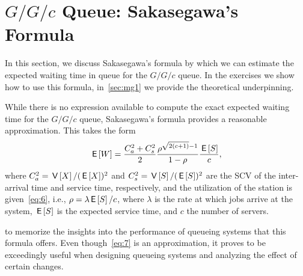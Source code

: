 


\section{$G/G/c$ Queue: Sakasegawa's Formula}\label{sec:gg1}



In this section, we discuss Sakasegawa's formula by which we can estimate the expected waiting time in queue for the $G/G/c$ queue.
In the exercises we  show how to use this formula, in~\cref{sec:mg1} we provide the theoretical underpinning.




While there is no expression available to compute the exact expected waiting time for the $G/G/c$ queue, Sakasegawa's formula provides a reasonable approximation.
This takes the form
\begin{equation}\label{eq:7}
 \,\mathsf{E}\left[W\right] = \frac{C_a^2+C_s^2}2 \frac{\rho^{\sqrt{2(c+1)}-1}}{1-\rho} \frac{\,\mathsf{E}\left[S\right]}{c},
\end{equation}
where $C_a^2 = \,\mathsf{V}\left[X\right]/(\,\mathsf{E}\left[X\right] )^2$  and $C_s^2=\,\mathsf{V}\left[S\right]/(\,\mathsf{E}\left[S\right])^2$ are  the SCV of the inter-arrival time and service time, respectively, and  the utilization of the station
is given~\cref{eq:6}, i.e., $\rho = \lambda \,\mathsf{E}\left[S\right]/c$, where $\lambda$ is the rate at which jobs arrive at the system, $\,\mathsf{E}\left[S\right]$ is the expected service time, and $c$ the number of servers.



 to memorize the insights into the performance of queueing systems that this formula offers.
Even though~\cref{eq:7} is an approximation, it proves to be exceedingly useful when designing queueing systems and analyzing the effect of certain changes.

